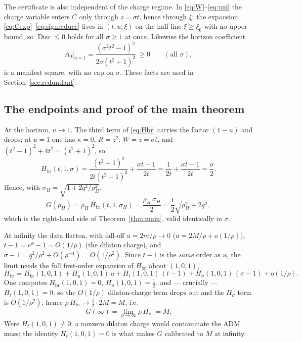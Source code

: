 \documentclass[11pt]{article}
\theoremstyle{plain}
\theoremstyle{definition}
\newcommand{\rH}{\rho_{\!H}}
\newcommand{\Hbr}{H_{\mathrm{br}}}
\newcommand{\Disc}{\operatorname{Disc}}
\begin{document}
The certificate is also independent of the charge regime. In \eqref{eq:W}--\eqref{eq:uni} the charge variable
enters $C$ only through $z=\sigma t$, hence through $\xi$; the expansion \eqref{eq:Cexp}--\eqref{eq:signreduce}
lives in $(t,u,\xi)$ on the half-line $\xi\ge\xi_0$ with no upper bound, so $\Disc\le0$ holds for all
$\sigma\ge1$ at once. Likewise the horizon coefficient
\begin{equation}\label{eq:A0end}
  A_0\big|_{u=1}=\frac{(\sigma^2t^2-1)^2}{2\sigma(t^2+1)^2}\ \ge0\qquad(\text{all }\sigma),
\end{equation}
is a manifest square, with no cap on $\sigma$. These facts are used in Section~\ref{sec:redundant}.

\subsection{The endpoints and proof of the main theorem}\label{sec:endpoints}

At the horizon, $u\to1$. The third term of \eqref{eq:Hbr} carries the factor $(1-u)$ and drops; at $u=1$ one
has $\kappa=0$, $R=z^2$, $W=z=\sigma t$, and $(t^2-1)^2+4t^2=(t^2+1)^2$, so
\begin{equation}\label{eq:Hend}
  \Hbr(t,1,\sigma)=\frac{(t^2+1)^2}{2t(t^2+1)^2}+\frac{\sigma t-1}{2t}
   =\frac{1}{2t}+\frac{\sigma t-1}{2t}=\frac{\sigma}{2}.
\end{equation}
Hence, with $\sigma_H=\sqrt{1+2q^2/\rH^2}$,
\begin{equation}\label{eq:Gend}
  G(\rH)=\rH\,\Hbr(t,1,\sigma_H)=\frac{\rH\,\sigma_H}{2}=\frac12\sqrt{\rH^2+2q^2},
\end{equation}
which is the right-hand side of Theorem~\ref{thm:main}, valid identically in $\sigma$.

At infinity the data flatten, with fall-off $u=2m/\rho\to0$ ($u=2M/\rho+o(1/\rho)$), $t-1=e^\phi-1=O(1/\rho)$
(the dilaton charge), and $\sigma-1=q^2/\rho^2+O(\rho^{-4})=O(1/\rho^2)$. Since $t-1$ is the \emph{same}
order as $u$, the limit needs the full first-order expansion of $\Hbr$ about $(1,0,1)$,
\[
  \Hbr=\Hbr(1,0,1)+H_u(1,0,1)\,u+H_t(1,0,1)\,(t-1)+H_\sigma(1,0,1)\,(\sigma-1)+o(1/\rho).
\]
One computes $\Hbr(1,0,1)=0$, $H_u(1,0,1)=\tfrac12$, and --- crucially --- $H_t(1,0,1)=0$, so the
$O(1/\rho)$ dilaton-charge term drops out and the $H_\sigma$ term is $O(1/\rho^2)$; hence $\rho\,\Hbr\to
\tfrac12\cdot2M=M$, i.e.
\begin{equation}\label{eq:Ginf}
  G(\infty)=\lim_{\rho\to\infty}\rho\,\Hbr=M .
\end{equation}
Were $H_t(1,0,1)\ne0$, a nonzero dilaton charge would contaminate the ADM mass; the identity
$H_t(1,0,1)=0$ is what makes $G$ calibrated to $M$ at infinity.
\end{document}
